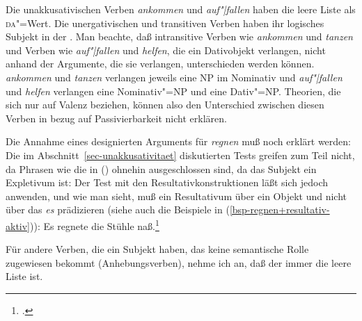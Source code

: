 \z
Die unakkusativischen Verben \emph{ankommen} und \emph{auf"|fallen} haben die leere Liste als \textsc{da}"=Wert.
Die unergativischen und transitiven Verben haben ihr logisches Subjekt in der \dalist.
Man beachte, daß intransitive Verben wie \emph{ankommen} und \emph{tanzen} und Verben
wie \emph{auf"|fallen} und \emph{helfen}, die ein Dativobjekt verlangen,
nicht anhand der Argumente, die sie verlangen, unterschieden werden können.
\Dh \emph{ankommen} und \emph{tanzen} verlangen jeweils eine NP im Nominativ und \emph{auf"|fallen}
und \emph{helfen} verlangen eine Nominativ"=NP und eine Dativ"=NP.
Theorien, die sich nur auf Valenz beziehen, können also den Unterschied zwischen diesen
Verben in bezug auf Passivierbarkeit nicht erklären. 

Die Annahme eines designierten Arguments für \emph{regnen} muß noch erklärt werden:
Die im Abschnitt~\ref{sec-unakkusativitaet} diskutierten Tests greifen zum Teil nicht,
da Phrasen wie die in () ohnehin ausgeschlossen sind, da das Subjekt ein Expletivum ist:
\eal
{}
\zl
Der Test mit den Resultativkonstruktionen läßt sich jedoch anwenden, und wie man sieht,
muß ein Resultativum über ein Objekt und nicht über das \emph{es} prädizieren (siehe auch die Beispiele in
(\ref{bsp-regnen+resultativ-aktiv})):
\ea
Es regnete die Stühle naß.\footnote{
  .
}
\z

\noindent
Für andere Verben, die ein Subjekt haben, das keine semantische Rolle zugewiesen bekommt (Anhebungsverben),
nehme ich an, daß der \daw immer die leere Liste ist.



